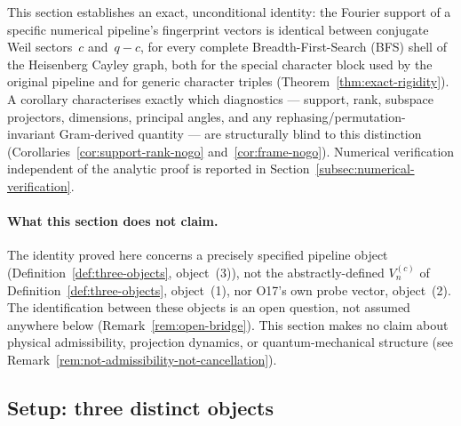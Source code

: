 \documentclass[11pt,a4paper]{article}
\begin{document}
  This section establishes an exact, unconditional identity: the Fourier support of a specific
  numerical pipeline's fingerprint vectors is identical between conjugate Weil sectors~$c$ and~$q-c$,
  for every complete Breadth-First-Search (BFS) shell of the Heisenberg Cayley graph, both for the
  special character block used by the original pipeline and for generic character triples
  (Theorem~\ref{thm:exact-rigidity}). A corollary characterises exactly which diagnostics ---
  support, rank, subspace projectors, dimensions, principal angles, and any rephasing/permutation-
  invariant Gram-derived quantity --- are structurally blind to this distinction
  (Corollaries~\ref{cor:support-rank-nogo} and~\ref{cor:frame-nogo}). Numerical verification
  independent of the analytic proof is reported in
  Section~\ref{subsec:numerical-verification}.

  \paragraph{What this section does not claim.}
    The identity proved here concerns a precisely specified pipeline object
    (Definition~\ref{def:three-objects}, object~(3)), not the abstractly-defined $V_n^{(c)}$ of
    Definition~\ref{def:three-objects}, object~(1), nor O17's own probe vector, object~(2). The
    identification between these objects is an open question, not assumed anywhere below
    (Remark~\ref{rem:open-bridge}). This section makes no claim about physical admissibility,
    projection dynamics, or quantum-mechanical structure (see
    Remark~\ref{rem:not-admissibility-not-cancellation}).

  \subsection{Setup: three distinct objects}
    \label{subsec:q1-setup}
\end{document}
